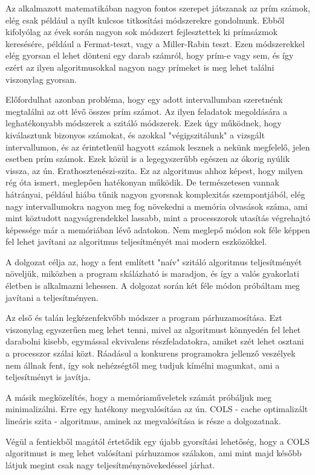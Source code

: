 \documentclass[twoside, a4paper, 12pt]{article}
\begin{document}
Az alkalmazott matematikában nagyon fontos szerepet játszanak az prím számok, elég csak például a nyílt kulcsos titkosítási módszerekre gondolnunk. Ebből kifolyólag az évek során nagyon sok módszert fejlesztettek ki prímsázmok keresésére, például a Fermat-teszt, vagy a Miller-Rabin teszt. Ezen módszerekkel elég gyorsan el lehet dönteni egy darab számról, hogy prím-e vagy sem, és így ezért az ilyen algoritmusokkal nagyon nagy prímeket is meg lehet találni viszonylag gyorsan. \par
Előfordulhat azonban probléma, hogy egy adott intervallumban szeretnénk megtalálni az ott lévő összes prím számot. Az ilyen feladatok megoldására a leghatékonyabb módszerek a szitáló módszerek. Ezek úgy működnek, hogy kiválasztunk bizonyos számokat, és azokkal "végigszitálunk" a vizsgált intervallumon, és az érintetlenül hagyott számok lesznek a nekünk megfelelő, jelen esetben prím számok. Ezek közül is a legegyszerűbb egészen az ókorig nyúlik vissza, az ún. Erathosztenészi-szita. Ez az algoritmus ahhoz képest, hogy milyen rég óta ismert, meglepően hatékonyan működik. De természetesen vannak hátrányai, például hiába tűnik nagyon gyorsnak komplexitás szempontjából, elég nagy intervallumokra nagyon meg fog növekedni a memória olvasások száma, ami mint köztudott nagyságrendekkel lassabb, mint a processzorok utasítás végrehajtó képessége már a memóriában lévő adatokon. Nem meglepő módon sok féle képpen fel lehet javítani az algoritmus teljesítményét mai modern eszközökkel. \par
A dolgozat célja az, hogy a fent említett "naív" szitáló algoritmus teljesítményét növeljük, miközben a program skálázható is maradjon, és így a valós gyakorlati életben is alkalmazni lehessen. A dolgozat során két féle módon próbáltam meg javítani a teljesítményen.\par
Az első és talán legkézenfekvőbb módszer a program párhuzamosítása. Ezt viszonylag egyszerűen meg lehet tenni, mivel az algoritmust könnyedén fel lehet darabolni kisebb, egymással ekvivalens részfeladatokra, amiket szét lehet osztani a processzor szálai közt. Ráadásul a konkurens programokra jellenző veszélyek nem állnak fent, így sok nehézségtől meg tudjuk kímélni magunkat, ami a teljesítményt is javítja. \par
A másik megközelítés, hogy a memóriaműveletek számát próbáljuk meg minimalizálni. Erre egy hatékony megvalósítása az ún. COLS - cache optimalizált lineáris szita - algoritmus, aminek az megvalósítása is része a dolgozatnak.\par
Végül a fentiekből magától értetődik egy újabb gyorsítási lehetőség, hogy a COLS algoritmust is meg lehet valósítani párhuzamos szálakon, ami mint majd később látjuk megint csak nagy teljesítménynövekedéssel járhat.\par
\end{document}
